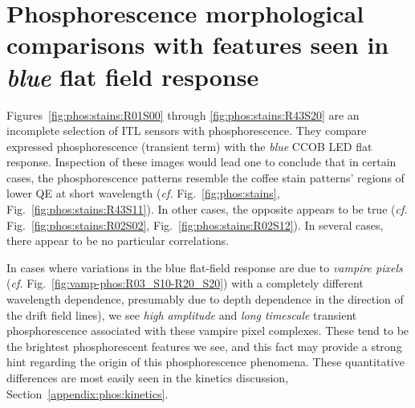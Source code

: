 \section{Phosphorescence morphological comparisons with features seen in {\it blue} flat field response}
\label{appendix:phos:coffeestains}

Figures~\ref{fig:phos:stains:R01S00} through \ref{fig:phos:stains:R43S20} are an incomplete selection of ITL sensors with phosphorescence. They compare expressed phosphorescence (transient term) with the {\it blue} CCOB LED flat response. Inspection of these images would lead one to conclude that in certain cases, the phosphorescence patterns resemble the coffee stain patterns' regions of lower QE at short wavelength ({\it cf.} Fig.~\ref{fig:phos:stains}, Fig.~\ref{fig:phos:stains:R43S11}). In other cases, the opposite appears to be true ({\it cf.} Fig.~\ref{fig:phos:stains:R02S02}, Fig.~\ref{fig:phos:stains:R02S12}). In several cases, there appear to be no particular correlations. 

In cases where variations in the blue flat-field response are due to {\it vampire pixels} ({\it cf.} Fig.~\ref{fig:vamp-phos:R03_S10-R20_S20}) with a completely different wavelength dependence, presumably due to depth dependence in the direction of the drift field lines), we see {\it high amplitude} and {\it long timescale} transient phosphorescence associated with these vampire pixel complexes. These tend to be the brightest phosphorescent features we see, and this fact may provide a strong hint regarding the origin of this phosphorescence phenomena. These quantitative differences are most easily seen in the kinetics discussion, Section~\ref{appendix:phos:kinetics}.

